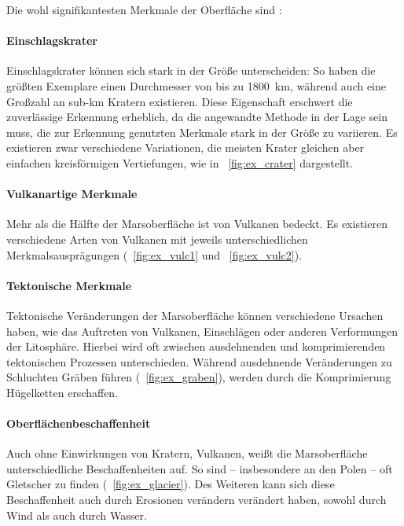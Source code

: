 Die wohl signifikantesten Merkmale der Oberfläche sind \ua: \cite[Kap.~7]{greeley_13}
\paragraph{Einschlagskrater}
Einschlagskrater können sich stark in der Größe unterscheiden: So haben die größten Exemplare einen Durchmesser von bis zu \SI{1800}{\kilo\meter}, während auch eine Großzahl an sub-\si{\kilo\meter} Kratern existieren. Diese Eigenschaft erschwert die zuverlässige Erkennung erheblich, da die angewandte Methode in der Lage sein muss, die zur Erkennung genutzten Merkmale stark in der Größe zu variieren. Es existieren zwar verschiedene Variationen, die meisten Krater gleichen aber einfachen kreisförmigen Vertiefungen, wie in \figurename~\ref{fig:ex_crater} dargestellt.
\paragraph{Vulkanartige Merkmale}
Mehr als die Hälfte der Marsoberfläche ist von Vulkanen bedeckt. Es existieren verschiedene Arten von Vulkanen mit jeweils unterschiedlichen Merkmalsausprägungen (\vgl \figurename~\ref{fig:ex_vulc1} und \figurename~\ref{fig:ex_vulc2}). \cite[Kap.~7]{greeley_13} 
\paragraph{Tektonische Merkmale}
Tektonische Veränderungen der Marsoberfläche können verschiedene Ursachen haben, wie \zB das Auftreten von Vulkanen, Einschlägen oder anderen Verformungen der Litosphäre. \cite[Kap.~7]{greeley_13} Hierbei wird oft zwischen ausdehnenden und komprimierenden tektonischen Prozessen unterschieden. Während ausdehnende Veränderungen zu Schluchten \bzw Gräben führen (\vgl \figurename~\ref{fig:ex_graben}), werden durch die Komprimierung Hügelketten erschaffen.
\paragraph{Oberflächenbeschaffenheit}
Auch ohne Einwirkungen von Kratern, Vulkanen, \etc weißt die Marsoberfläche unterschiedliche Beschaffenheiten auf. So sind -- insbesondere an den Polen -- oft Gletscher zu finden (\vgl \figurename~\ref{fig:ex_glacier}). Des Weiteren kann sich diese Beschaffenheit auch durch Erosionen verändern \bzw verändert haben, sowohl durch Wind als auch durch Wasser.

